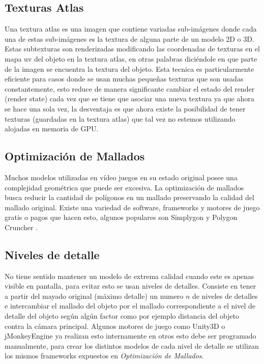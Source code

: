 \subsection{Texturas Atlas}
Una textura atlas es una imagen que contiene variadas sub-imágenes donde cada una de estas sub-imágenes es la textura de alguna parte de un modelo 2D o 3D. Estas subtexturas son renderizadas modificando las coordenadas de texturas en el mapa uv del objeto en la textura atlas, en otras palabras diciéndole en que parte de la imagen se encuentra la textura del objeto. Esta tecnica es particularmente eficiente para casos donde se usan muchas pequeñas texturas que son usadas constantemente, esto reduce de manera significante cambiar el estado del render (render state) cada vez que se tiene que asociar una nueva textura ya que ahora se hace una sola vez, la desventaja es que ahora existe la posibilidad de tener texturas (guardadas en la textura atlas) que tal vez no estemos utilizando alojadas en memoria de GPU.
\subsection{Optimización de Mallados}
Muchos modelos utilizadas en vídeo juegos en su estado original posee una complejidad geométrica que puede ser excesiva.  La optimización de mallados busca reducir la cantidad de polígonos en un mallado preservando la calidad del mallado original. Existe una variedad de software, frameworks y motores de juego gratis o pagos que hacen esto, algunos populares son Simplygon \cite{simplygon} y Polygon Cruncher \cite{polygon_sdk}.
\subsection{Niveles de detalle}
No tiene sentido mantener un modelo de extrema calidad cuando este es apenas visible en pantalla, para evitar esto se usan niveles de detalles. Consiste en tener a partir del mayado original (máximo detalle) un numero $n$ de niveles de detalles e intercambiar el mallado del objeto por el mallado correspondiente a el nivel de detalle del objeto según algún factor como por ejemplo distancia del objeto contra la cámara principal. Algunos motores de juego como Unity3D \cite{unity_lod} o jMonkeyEngine \cite{jmonkey} ya realizan esto internamente en otros esto debe ser programado manualmente, para crear los distintos modelos de cada nivel de detalle se utilizan los mismos frameworks expuestos en \emph{Optimización de Mallados}.
